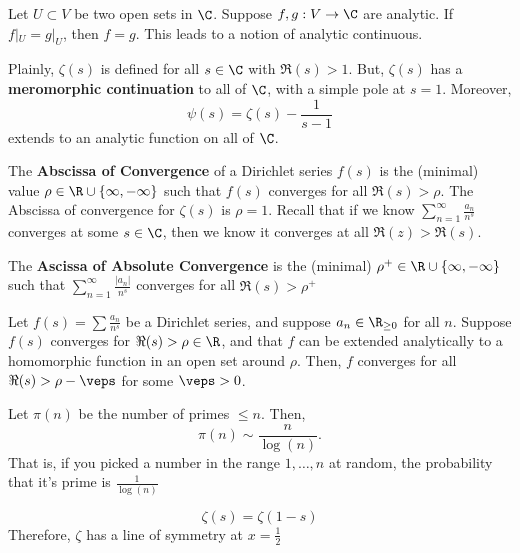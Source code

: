 \begin{thm}
    Let $U\subset V$ be two open sets in $\C$. Suppose $f,g : V \to \C$ are analytic. If $f|_U = g|_U$, then $f=g$. This leads to a notion of analytic continuous.
\end{thm}

\begin{thm}
    Plainly, $\zeta(s)$ is defined for all $s \in \C$ with $\Re (s) > 1$. But, $\zeta(s)$ has a \textbf{meromorphic continuation} to all of $\C$, with a simple pole at $s=1$. Moreover,
    $$\psi (s) = \zeta (s) - \frac{1}{s-1}$$
    extends to an analytic function on all of $\C$.
\end{thm}

\begin{defn}
    The \textbf{Abscissa of Convergence} of a Dirichlet series $f(s)$ is the (minimal) value $\rho \in \R \cup \{ \infty, -\infty\}$ such that $f(s)$ converges for all $\Re(s) > \rho $. The Abscissa of convergence for $\zeta(s)$ is $\rho=1$. Recall that if we know $\sum_{n=1}^\infty \frac{a_n}{n^s}$ converges at some $s \in \C$, then we know it converges at all $\Re(z) > \Re(s)$.

    The \textbf{Ascissa of Absolute Convergence} is the (minimal) $\rho^+ \in \R \cup \{\infty,-\infty\}$ such that $\sum_{n=1}^\infty \frac{|a_n|}{n^s}$ converges for all $\Re(s) > \rho^+$
\end{defn}

\begin{prop}
    Let $f(s) = \sum \frac{a_n}{n^s}$ be a Dirichlet series, and suppose $a_n \in \R_{\geq 0}$ for all $n$. Suppose $f(s)$ converges for $\Re(s) > \rho \in \R$, and that $f$ can be extended analytically to a homomorphic function in an open set around $\rho$. Then, $f$ converges for all $\Re(s) > \rho - \veps$ for some $\veps>0$.
\end{prop}

\begin{notebox*}
    Let $\pi(n)$ be the number of primes $\leq n$. Then,
    $$\pi (n) \sim \frac{n}{\log (n)}.$$
    That is, if you picked a number in the range $1,\dots ,n$ at random, the probability that it's prime is $\frac{1}{\log (n)}$
\end{notebox*}

\begin{prop}
    $$\zeta (s) = \zeta (1-s)$$
    Therefore, $\zeta$ has a line of symmetry at $x=\frac{1}{2}$
\end{prop}

